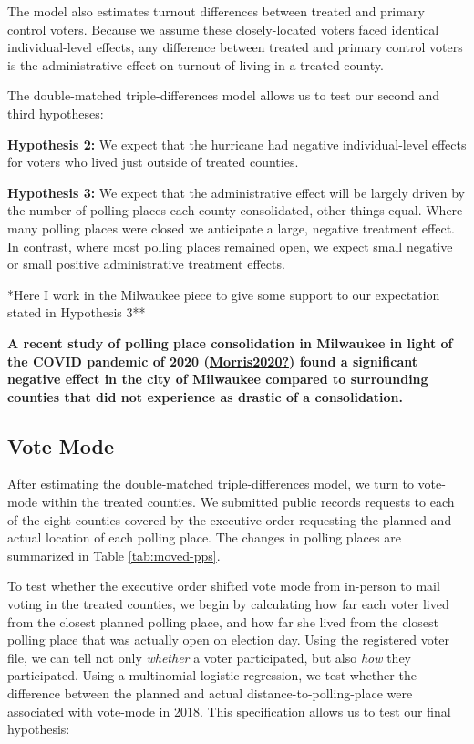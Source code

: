 \documentclass[
  12pt,
]{article}
\begin{document}
The model also estimates turnout differences between treated and primary control voters. Because we assume these closely-located voters faced identical individual-level effects, any difference between treated and primary control voters is the administrative effect on turnout of living in a treated county.

The double-matched triple-differences model allows us to test our second and third hypotheses:

\textbf{Hypothesis 2:} We expect that the hurricane had negative individual-level effects for voters who lived just outside of treated counties.

\textbf{Hypothesis 3:} We expect that the administrative effect will be largely driven by the number of polling places each county consolidated, other things equal. Where many polling places were closed we anticipate a large, negative treatment effect. In contrast, where most polling places remained open, we expect small negative or small positive administrative treatment effects.

*Here I work in the Milwaukee piece to give some support to our expectation stated in Hypothesis 3**

\textbf{A recent study of polling place consolidation in Milwaukee in light of the COVID pandemic of 2020 (\protect\hyperlink{ref-Morris2020}{\textbf{Morris2020?}}) found a significant negative effect in the city of Milwaukee compared to surrounding counties that did not experience as drastic of a consolidation.}

\hypertarget{vote-mode}{%
\subsection*{Vote Mode}\label{vote-mode}}

After estimating the double-matched triple-differences model, we turn to vote-mode within the treated counties. We submitted public records requests to each of the eight counties covered by the executive order requesting the planned and actual location of each polling place. The changes in polling places are summarized in Table \ref{tab:moved-pps}.

To test whether the executive order shifted vote mode from in-person to mail voting in the treated counties, we begin by calculating how far each voter lived from the closest planned polling place, and how far she lived from the closest polling place that was actually open on election day. Using the registered voter file, we can tell not only \emph{whether} a voter participated, but also \emph{how} they participated. Using a multinomial logistic regression, we test whether the difference between the planned and actual distance-to-polling-place were associated with vote-mode in 2018. This specification allows us to test our final hypothesis:
\end{document}
